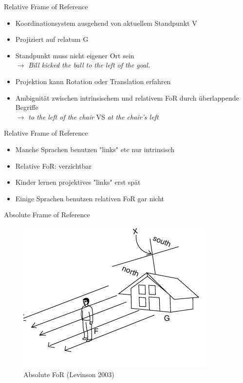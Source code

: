 \documentclass[12pt,a4paper]{beamer}
\begin{document}
\begin{frame}{Relative Frame of Reference}
\begin{itemize}
\item Koordinationsystem ausgehend von aktuellem Standpunkt V
\item Projiziert auf relatum G
\item Standpunkt muss nicht eigener Ort sein \\
$\to$ \textit{Bill kicked the ball to the left of the goal.}
\item Projektion kann Rotation oder Translation erfahren
\item Ambiguität zwischen intrinsischem und relativem FoR durch überlappende Begriffe \\
$\to$ \textit{to the left of the chair} VS \textit{at the chair's left}
\end{itemize}
\end{frame}

\begin{frame}{Relative Frame of Reference}
\begin{itemize}
\item Manche Sprachen benutzen "links" etc nur intrinsisch
\item Relative FoR: verzichtbar
\item Kinder lernen projektives "links" erst spät
\item Einige Sprachen benutzen relativen FoR gar nicht
\end{itemize}
\end{frame}



\begin{frame}{Absolute Frame of Reference}
\begin{figure}
\includegraphics[scale=0.7]{img/levinson_FOR_absolute.png}
\caption{Absolute FoR (Levinson 2003)}
\end{figure}
\end{frame}
\end{document}

